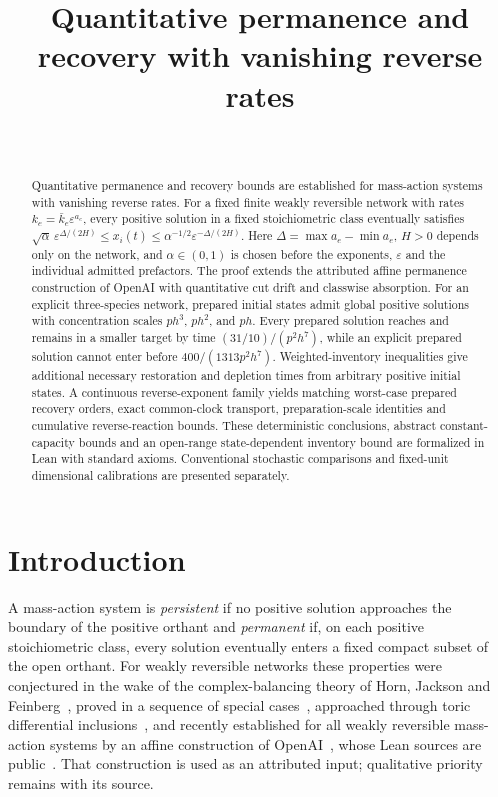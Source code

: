 \documentclass[11pt,a4paper]{article}
\title{Quantitative permanence and recovery with vanishing reverse rates}
\author{\PaperAuthor\\[2pt]{\small\PaperAffiliation}}
\date{\PaperDate}
\theoremstyle{plain}
\theoremstyle{definition}
\theoremstyle{remark}
\newcommand{\eps}{\varepsilon}
\begin{document}
\maketitle

\begin{abstract}
Quantitative permanence and recovery bounds are established for mass-action systems with vanishing reverse rates. For a fixed finite weakly reversible network with rates $k_e=\bar k_e\eps^{a_e}$, every positive solution in a fixed stoichiometric class eventually satisfies $\sqrt\alpha\,\eps^{\Delta/(2H)}\le x_i(t)\le\alpha^{-1/2}\eps^{-\Delta/(2H)}$. Here $\Delta=\max a_e-\min a_e$, $H>0$ depends only on the network, and $\alpha\in(0,1)$ is chosen before the exponents, $\eps$ and the individual admitted prefactors. The proof extends the attributed affine permanence construction of OpenAI with quantitative cut drift and classwise absorption. For an explicit three-species network, prepared initial states admit global positive solutions with concentration scales $ph^3$, $ph^2$, and $ph$. Every prepared solution reaches and remains in a smaller target by time $(31/10)/(p^2h^7)$, while an explicit prepared solution cannot enter before $400/(1313p^2h^7)$. Weighted-inventory inequalities give additional necessary restoration and depletion times from arbitrary positive initial states. A continuous reverse-exponent family yields matching worst-case prepared recovery orders, exact common-clock transport, preparation-scale identities and cumulative reverse-reaction bounds. These deterministic conclusions, abstract constant-capacity bounds and an open-range state-dependent inventory bound are formalized in Lean with standard axioms. Conventional stochastic comparisons and fixed-unit dimensional calibrations are presented separately.
\end{abstract}

\section{Introduction}
\label{sec:intro}

A mass-action system is \emph{persistent} if no positive solution approaches the boundary of the positive orthant and \emph{permanent} if, on each positive stoichiometric class, every solution eventually enters a fixed compact subset of the open orthant. For weakly reversible networks these properties were conjectured in the wake of the complex-balancing theory of Horn, Jackson and Feinberg~\cite{HornJackson1972,Feinberg1972,Horn1974,Feinberg2019}, proved in a sequence of special cases~\cite{Sontag2001,SiegelMacLean2000,AngeliDeLeenheerSontag2007,Anderson2008,AndersonShiu2010,Anderson2011,Pantea2012,CraciunNazarovPantea2013,GopalkrishnanMillerShiu2014,BorosHofbauer2020}, approached through toric differential inclusions~\cite{Craciun2015,CraciunDeshpande2020,JohnstonPanteaDonnell2016}, and recently established for all weakly reversible mass-action systems by an affine construction of OpenAI~\cite{OpenAI2026Uniform,OpenAI2026Boundedness}, whose Lean sources are public~\cite{OpenAI2026Formal}. That construction is used as an attributed input; qualitative priority remains with its source.
\end{document}
